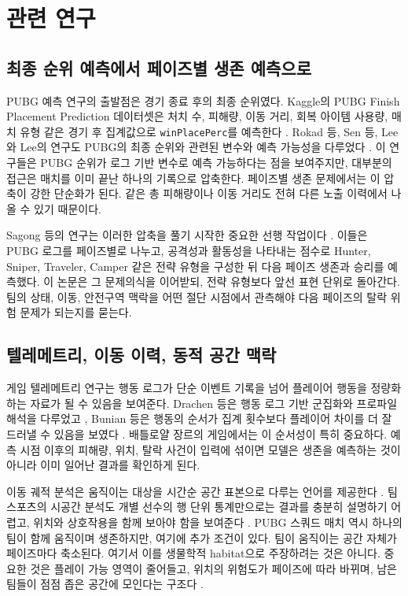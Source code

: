\section{관련 연구}
\label{sec:related-work}

\subsection{최종 순위 예측에서 페이즈별 생존 예측으로}

PUBG 예측 연구의 출발점은 경기 종료 후의 최종 순위였다. Kaggle의 PUBG Finish
Placement Prediction 데이터셋은 처치 수, 피해량, 이동 거리, 회복 아이템 사용량,
매치 유형 같은 경기 후 집계값으로 \texttt{winPlacePerc}를 예측한다
\cite{kagglePubgFinishPlacement}. Rokad 등, Sen 등, Lee와 Lee의 연구도 PUBG의
최종 순위와 관련된 변수와 예측 가능성을 다루었다
\cite{rokad2019pubgPlacement,sen2021pubgFinalRank,lee2025pubgRank}. 이 연구들은
PUBG 순위가 로그 기반 변수로 예측 가능하다는 점을 보여주지만, 대부분의 접근은
매치를 이미 끝난 하나의 기록으로 압축한다. 페이즈별 생존 문제에서는 이 압축이
강한 단순화가 된다. 같은 총 피해량이나 이동 거리도 전혀 다른 노출 이력에서 나올
수 있기 때문이다.

Sagong 등의 연구는 이러한 압축을 풀기 시작한 중요한 선행 작업이다
\cite{sagong2025hunterCamper}. 이들은 PUBG 로그를 페이즈별로 나누고, 공격성과
활동성을 나타내는 점수로 Hunter, Sniper, Traveler, Camper 같은 전략 유형을
구성한 뒤 다음 페이즈 생존과 승리를 예측했다. 이 논문은 그 문제의식을 이어받되,
전략 유형보다 앞선 표현 단위로 돌아간다. 팀의 상태, 이동, 안전구역 맥락을 어떤
절단 시점에서 관측해야 다음 페이즈의 탈락 위험 문제가 되는지를 묻는다.

\subsection{텔레메트리, 이동 이력, 동적 공간 맥락}

게임 텔레메트리 연구는 행동 로그가 단순 이벤트 기록을 넘어 플레이어 행동을
정량화하는 자료가 될 수 있음을 보여준다. Drachen 등은 행동 로그 기반 군집화와
프로파일 해석을 다루었고 \cite{drachen2014behavioralTelemetry}, Bunian 등은 행동의
순서가 집계 횟수보다 플레이어 차이를 더 잘 드러낼 수 있음을 보였다
\cite{bunian2018hmmGameBehavior}. 배틀로얄 장르의 게임에서는 이 순서성이 특히
중요하다. 예측 시점 이후의 피해량, 위치, 탈락 사건이 입력에 섞이면 모델은 생존을
예측하는 것이 아니라 이미 일어난 결과를 확인하게 된다.

이동 궤적 분석은 움직이는 대상을 시간순 공간 표본으로 다루는 언어를 제공한다
\cite{wang2020trajectorySurvey}. 팀 스포츠의 시공간 분석도 개별 선수의 행 단위
통계만으로는 결과를 충분히 설명하기 어렵고, 위치와 상호작용을 함께 보아야 함을
보여준다 \cite{gudmundsson2016teamSportsSurvey}. PUBG 스쿼드 매치 역시 하나의
팀이 함께 움직이며 생존하지만, 여기에 추가 조건이 있다. 팀이 움직이는 공간 자체가
페이즈마다 축소된다. 여기서 이를 생물학적 habitat으로 주장하려는 것은 아니다. 중요한
것은 플레이 가능 영역이 줄어들고, 위치의 위험도가 페이즈에 따라 바뀌며, 남은
팀들이 점점 좁은 공간에 모인다는 구조다 \cite{fahrig2003fragmentation,nathan2008movement}.

